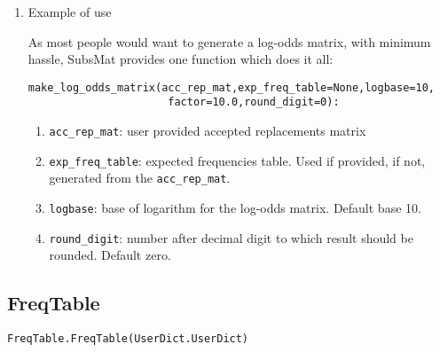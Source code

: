 \begin{enumerate}
\begin{enumerate}
\begin{enumerate}
\end{enumerate}

\end{enumerate}

\item Example of use

As most people would want to generate a log-odds matrix, with minimum hassle, SubsMat provides one function which does it all:

\begin{verbatim}
make_log_odds_matrix(acc_rep_mat,exp_freq_table=None,logbase=10,
                      factor=10.0,round_digit=0):
\end{verbatim}

\begin{enumerate}
  \item \verb|acc_rep_mat|: user provided accepted replacements matrix
  \item \verb|exp_freq_table|: expected frequencies table. Used if provided, if not, generated from the \verb|acc_rep_mat|.
  \item \verb|logbase|: base of logarithm for the log-odds matrix. Default base 10.
  \item \verb|round_digit|: number after decimal digit to which result should be rounded. Default zero.
\end{enumerate}

\end{enumerate}

\subsection{FreqTable}
\label{sec:freq_table}

\begin{verbatim}
FreqTable.FreqTable(UserDict.UserDict)
\end{verbatim}

